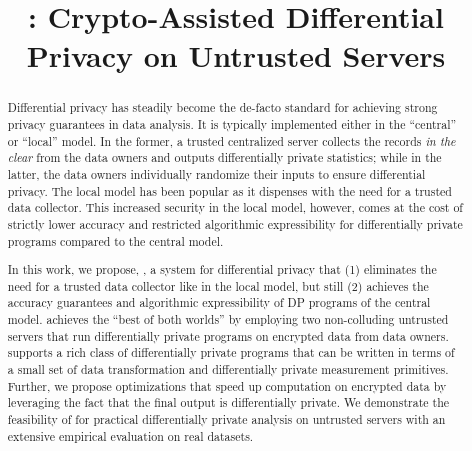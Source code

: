 \documentclass[sigconf]{acmart}
\begin{document}
\title{\system: Crypto-Assisted Differential Privacy on Untrusted Servers}
\author{}
\begin{abstract}
Differential privacy has steadily become the de-facto standard for achieving strong privacy guarantees in data analysis. It is typically implemented either in the ``central'' or ``local'' model. In the former, a trusted centralized server collects the records \textit{in the clear} from the data owners and outputs differentially private statistics; while in the latter, the data owners individually randomize their inputs to ensure differential privacy.  The local model has been popular as it dispenses with the need for a trusted data collector. This increased security in the local model, however, comes at the cost of strictly lower accuracy and restricted algorithmic expressibility for differentially private programs compared to the central model. 

In this work, we propose, \system, a  system for differential privacy that (1) eliminates the need for a trusted data collector like in the local model, but still (2) achieves the accuracy guarantees and algorithmic expressibility of DP programs of the central model. \system achieves the ``best of both worlds'' by employing two non-colluding untrusted servers that run differentially private programs on encrypted data from data owners. \system 
supports a rich class of differentially private programs that can be written in terms of a small set of data transformation and differentially private measurement primitives. Further, we propose optimizations that speed up computation on encrypted data by leveraging the fact that the final output is differentially private. We demonstrate the feasibility of \system for practical differentially private analysis on untrusted servers with an extensive empirical evaluation on real datasets.
\end{abstract}
\end{document}
